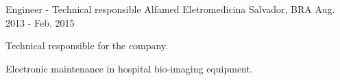 \begin{cventries}
  \cventry
    {Engineer - Technical responsible} %
    {Alfamed Eletromedicina} %
    {Salvador, BRA} %
    {Aug. 2013 - Feb. 2015} %
    {
      \begin{cvitems} %
        \item {Technical responsible for the company.}
        \item {Electronic maintenance in hospital bio-imaging equipment.}
      \end{cvitems}
    }
    

    
    

\end{cventries}
